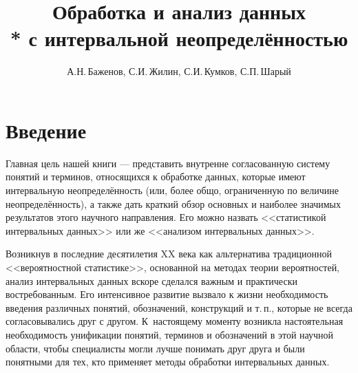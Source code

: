 \documentclass[a5paper,openany]{book}
\title{Обработка и анализ данных \\* 
               с интервальной неопределённостью}
\author{А.Н.\,Баженов, С.И.\,Жилин, С.И.\,Кумков, С.П.\,Шарый}
\begin{document}
  
\maketitle 

  
   
\tableofcontents      %
  
  
\chapter*{Введение}
  
  
Главная цель нашей книги --- представить внутренне согласованную систему понятий и 
терминов, относящихся к обработке данных, которые имеют интервальную неопределённость 
(или, более общо, ограниченную по величине неопределённость), а также дать краткий обзор 
основных и наиболее значимых результатов этого научного направления. Его можно назвать 
<<статистикой интервальных данных>> или же <<анализом интервальных данных>>. 
  
Возникнув в последние десятилетия XX века как альтернатива традиционной <<вероятностной 
статистике>>, основанной на методах теории вероятностей, анализ интервальных данных  
вскоре сделался важным и практически востребованным. Его интенсивное развитие вызвало 
к жизни необходимость введения различных понятий, обозначений, конструкций и т.\,п., 
которые не всегда согласовывались друг с другом. К~настоящему моменту возникла 
настоятельная необходимость унификации понятий, терминов и обозначений в этой научной 
области, чтобы специалисты могли лучше понимать друг друга и были понятными для тех, 
кто применяет методы обработки интервальных данных. 
  
\end{document}
